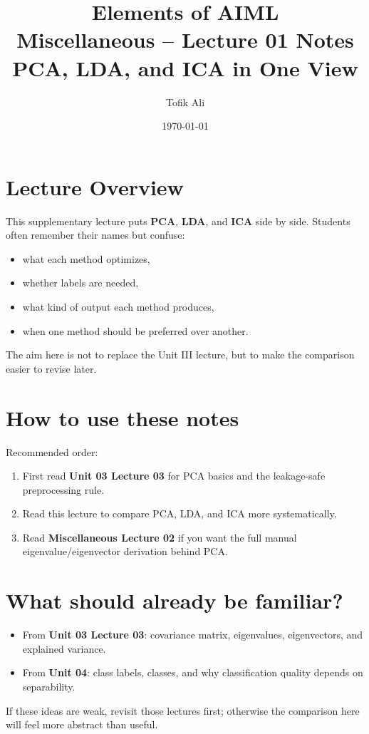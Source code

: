 \documentclass[11pt]{article}
\title{Elements of AIML\\Miscellaneous -- Lecture 01 Notes\\PCA, LDA, and ICA in One View}
\author{Tofik Ali}
\date{\today}
\begin{document}
\maketitle
\tableofcontents

\section{Lecture Overview}
This supplementary lecture puts \textbf{PCA}, \textbf{LDA}, and \textbf{ICA} side by side.
Students often remember their names but confuse:
\begin{itemize}[leftmargin=*]
  \item what each method optimizes,
  \item whether labels are needed,
  \item what kind of output each method produces,
  \item when one method should be preferred over another.
\end{itemize}
The aim here is not to replace the Unit III lecture, but to make the comparison easier to revise later.
\notesources{\AIMLMiscSources}

\section{How to use these notes}
Recommended order:
\begin{enumerate}[leftmargin=*]
  \item First read \textbf{Unit 03 Lecture 03} for PCA basics and the leakage-safe preprocessing rule.
  \item Read this lecture to compare PCA, LDA, and ICA more systematically.
  \item Read \textbf{Miscellaneous Lecture 02} if you want the full manual eigenvalue/eigenvector derivation behind PCA.
\end{enumerate}

\section{What should already be familiar?}
\begin{itemize}[leftmargin=*]
  \item From \textbf{Unit 03 Lecture 03}: covariance matrix, eigenvalues, eigenvectors, and explained variance.
  \item From \textbf{Unit 04}: class labels, classes, and why classification quality depends on separability.
\end{itemize}
If these ideas are weak, revisit those lectures first; otherwise the comparison here will feel more abstract than useful.
\end{document}
